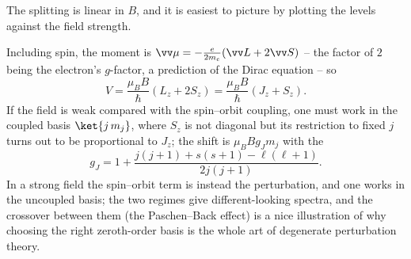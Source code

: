 The splitting is linear in $B$, and it is easiest to picture by plotting the levels against the field strength.

\begin{center}
\end{center}

\begin{remark}
    Including spin, the moment is $\vv \mu = -\frac{e}{2m_e}(\vv L + 2\vv S)$ -- the factor of $2$ being the electron's $g$-factor, a prediction of the Dirac equation -- so
    $$
    V = \frac{\mu_B B}{\hbar}\left( L_z + 2S_z \right) = \frac{\mu_B B}{\hbar}\left( J_z + S_z \right).
    $$
    If the field is weak compared with the spin--orbit coupling, one must work in the coupled basis $\ket{j\,m_j}$, where $S_z$ is not diagonal but its restriction to fixed $j$ turns out to be proportional to $J_z$; the shift is $\mu_B B g_J m_j$ with the 
    $$
    g_J = 1 + \frac{j(j+1)+s(s+1)-\ell(\ell+1)}{2j(j+1)}.
    $$
    In a strong field the spin--orbit term is instead the perturbation, and one works in the uncoupled basis; the two regimes give different-looking spectra, and the crossover between them (the Paschen--Back effect) is a nice illustration of why choosing the right zeroth-order basis is the whole art of degenerate perturbation theory.
\end{remark}

